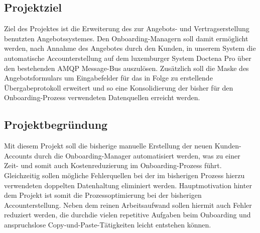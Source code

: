 \subsection{Projektziel} 
\label{sec:Projektziel}
Ziel des Projektes ist die Erweiterung des zur Angebots- und Vertragserstellung benutzten Angebotssystemes. Den Onboarding-Managern soll damit ermöglicht werden, nach Annahme des Angebotes durch den Kunden, in unserem System die automatische Accounterstellung auf dem luxemburger System Doctena Pro über den bestehenden \ac{AMQP} Message-Bus auszulösen. Zusätzlich soll die Maske des Angebotsformulars um Eingabefelder für das in Folge zu erstellende Übergabeprotokoll erweitert und so eine Konsolidierung der bisher für den Onboarding-Prozess verwendeten Datenquellen erreicht werden.

\subsection{Projektbegründung} 
\label{sec:Projektbegruendung}
Mit diesem Projekt soll die bisherige manuelle Erstellung der neuen Kunden-Accounts durch die Onboarding-Manager automatisiert werden, was zu einer Zeit- und somit auch Kostenreduzierung im Onboarding-Prozess führt. Gleichzeitig sollen mögliche Fehlerquellen bei der im bisherigen Prozess hierzu verwendeten doppelten Datenhaltung eliminiert werden.
Hauptmotivation hinter dem Projekt ist somit die Prozessoptimierung bei der bisherigen Accounterstellung. Neben dem reinen Arbeitsaufwand sollen hiermit auch Fehler reduziert werden, die durchdie vielen repetitive Aufgaben beim Onboarding und anspruchslose Copy-und-Paste-Tätigkeiten leicht entstehen können.

